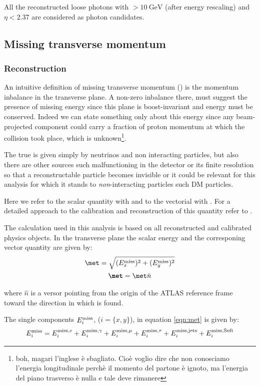 All the reconstructed loose photons with \ET $> \SI{10}{\GeV}$ (after energy rescaling) and $\eta<2.37$ are considered as photon candidates.


\subsection{Missing transverse momentum}
\label{sec:met}
\subsubsection{Reconstruction}

An intuitive definition of missing transverse momentum (\met) is the momentum inbalance in the transverse plane. A non-zero inbalance there, must suggest the presence of missing energy since this plane is boost-invariant and energy must be conserved. Indeed we can state something only about this energy since any beam-projected component could carry a fraction of proton momentum at which the collision took place, which is unknown\footnote{boh, magari l'inglese \`e sbagliato. Cio\`e voglio dire che non conosciamo l'energia longitudinale perch\`e il momento del partone \`e ignoto, ma l'energia del piano trasverso \`e nulla e tale deve rimanere}.

The true \met is given simply by neutrinos and non interacting particles, but also there are other sources such malfunctioning in the detector or its finite resolution so that a reconstructable particle becomes invisible or it could be relevant for this analysis for which it stands to \emph{non}-interacting particles such DM particles.

Here we refer to the scalar quantity with \met and to the vectorial with \textbf{\met}. For a detailed approach to the calibration and reconstruction of this quantity refer to \cite{met}.

The \met calculation used in this analysis is based on all reconstructed and calibrated physics objects. In the transverse plane the scalar energy and the corresponing vector quantity are given by:
\begin{gather}
\label{eqn:met}
	\met=\sqrt{(E_x^\textup{miss})^2+(E_y^\textup{miss})^2}\\
	\textbf{\met}=\met \hat{n}
\end{gather}

where $\hat{n}$ is a versor pointing from the origin of the ATLAS reference frame toward the direction in which \met is found.

The single components $E_i^\textup{miss}$, ($i=\{x,y\}$), in equation \ref{eqn:met} is given by:
\begin{equation}
	E_i^\textup{miss}=E_i^\textup{miss,$e$}+E_i^\textup{miss,$\gamma$}+E_i^\textup{miss,$\mu$}+E_i^\textup{miss,$\tau$}+E_i^\textup{miss,jets}+E_i^\textup{miss,Soft}
\end{equation}

